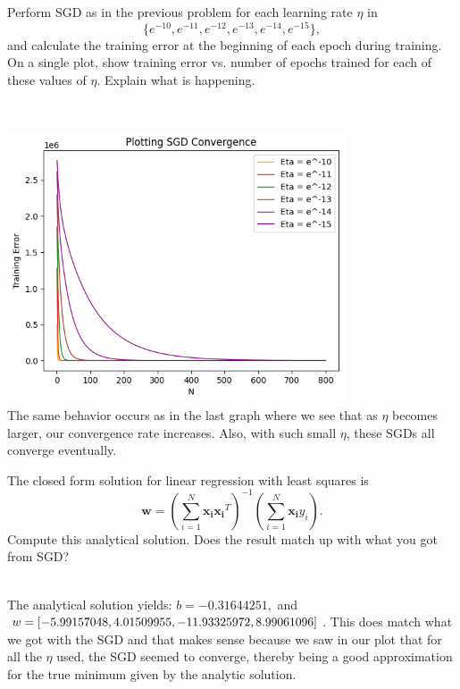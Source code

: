 \begin{problem}[2]
  Perform SGD as in the previous problem for each learning rate $\eta$ in \[\{e^{-10}, e^{-11}, e^{-12}, e^{-13}, e^{-14}, e^{-15}\},\] and calculate the training error at the beginning of each epoch during training.  On a single plot, show training error vs. number of epochs trained for each of these values of $\eta$. Explain what is happening.
\end{problem}
\begin{solution}
  \\
  \graphicspath{{images/}}
  \includegraphics[width=10cm]{Problem_3_H.png}
  \\
  The same behavior occurs as in the last graph where we see that as $\eta$ becomes larger, our convergence rate increases. Also, with such small $\eta$, these SGDs all converge eventually.
\end{solution}


\begin{problem}[2]
  The closed form solution for linear regression with least squares is \[\mathbf{w} = \left(\sum_{i=1}^N \mathbf{x_i}\mathbf{x_i}^T\right)^{-1}\left(\sum_{i=1}^N \mathbf{x_i}y_i\right).\]  Compute this analytical solution.  Does the result match up with what you got from SGD?
\end{problem}
\begin{solution}
  \\
 The analytical solution yields: $b = -0.31644251, $ and $w = [-5.99157048,  4.01509955, -11.93325972, \\ 8.99061096]$. This does match what we got with the SGD and that makes sense because we saw in our plot that for all the $\eta$ used, the SGD seemed to converge, thereby being a good approximation for the true minimum given by the analytic solution.
\end{solution}

